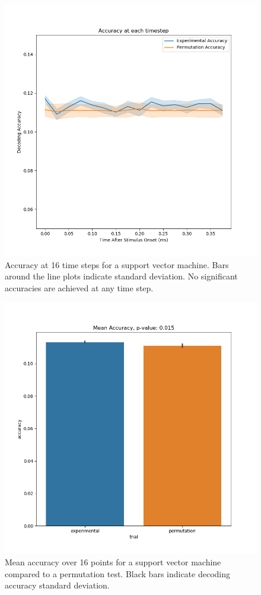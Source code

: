 \documentclass[../main.tex]{subfiles}
\begin{document}
\begin{figure}
    \centering
    \includegraphics[scale=0.7]{figures/results/timestep_accuracy_occipital_svm.png}
    \caption{Accuracy at 16 time steps for a support vector machine.  Bars around the line plots indicate standard deviation. No significant accuracies are achieved at any time step.}
    \label{timestep_svm_sensor}
\end{figure}

\begin{figure}
    \centering
    \includegraphics[scale=0.7]{figures/results/accuracy_occipital_svm.png}
    \caption{Mean accuracy over 16 points for a support vector machine compared to a permutation test. Black bars indicate decoding accuracy standard deviation.}
    \label{mean_svm_sensor}
\end{figure}
\end{document}
